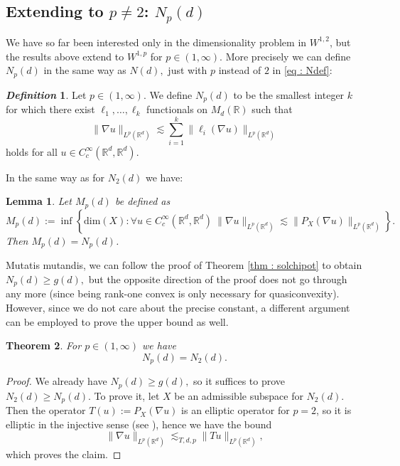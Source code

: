 \documentclass[11pt, a4paper, reqno]{elsarticle}
\newtheorem{theorem}{Theorem}[section]
\newtheorem{lemma}[theorem]{Lemma}
\theoremstyle{definition}
\newtheorem{definition}{\textsl{Definition}}
\theoremstyle{remark}
\begin{document}
\subsection{
Extending to \texorpdfstring{$p\neq 2$}{p!=2}:
\texorpdfstring{$N_p(d)$}{Np(d)}
}
We have so far been interested only in the dimensionality
problem in $W^{1,2}$, but the results above extend
to $W^{1,p}$ for $p\in(1,\infty).$ More precisely
we can define $N_p(d)$ in the same way as $N(d),$
just with $p$ instead of $2$ in \eqref{eq : Ndef}:
\begin{definition}\label{def : Np}
	Let $p\in (1,\infty)$. We define $N_p(d)$ to be
the smallest integer $k$ for which
there exist $\ell_1,\dots, \ell_k$ functionals on $M_d(\mathbb{R})$
such that
\begin{equation}
	\label{eq : Npdef}
	\|\nabla u\|_{L^p(\mathbb{R}^d)}
\lesssim
	\sum_{i=1}^k \|\ell_i(\nabla u)\|_{L^p(\mathbb{R}^d)}
\end{equation}
holds for all $u\in C^\infty_c(\mathbb R^d,\mathbb{R}^d)$.
\end{definition}
In the same way as for $N_2(d)$ we have:
\begin{lemma}
Let $M_p(d)$ be defined as
\begin{equation*}
	M_p(d)
:=
	\inf
	\left\{
		\mathrm{dim}(X)\colon  
		\forall u\in C^\infty_c(\mathbb{R}^d,\mathbb{R}^d)
		\  \|\nabla u\|_{L^p(\mathbb R^d)}
	\lesssim
		\| P_X(\nabla u)\|_{L^p(\mathbb R^d)}
	\right\}.
\end{equation*}
Then $M_p(d)=N_p(d)$.
\end{lemma}
Mutatis mutandis, we can follow the proof of Theorem \ref{thm : solchipot} to obtain
$N_p(d)\ge g(d),$ but the opposite direction of the proof
does not go through any more (since being rank-one convex
is only necessary for quasiconvexity). 
However, since we do not care about the precise constant,
a different argument can be employed to prove
the upper bound as well.
\begin{theorem}
For $p\in (1,\infty)$ we have
   \begin{equation*}
        N_p(d)= N_2(d).
    \end{equation*}
\end{theorem}
\begin{proof}
We already have $N_p(d)\ge g(d),$ so it suffices to prove
$N_2(d)\ge N_p(d)$. To prove it,
let $X$ be an admissible subspace for $N_2(d)$.
Then the operator $T(u):= P_X(\nabla u)$
is an elliptic operator for $p=2$, so it is
 elliptic in the injective sense
(see \cite[Theorems 5.1, 5.3]{Schaftingen}),
hence we have the bound
\begin{equation*}
	\|\nabla u\|_{L^p(\mathbb R^d)}
\lesssim_{T,d,p}
	\|T u\|_{L^p(\mathbb R^d)},
\end{equation*}
which proves the claim.
\end{proof}
\end{document}
